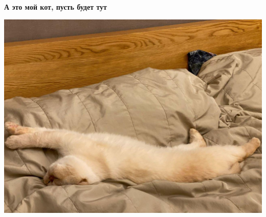 \documentclass[a4paper,12pt]{article}
\begin{document}
\clearpage
{\Large \begin{center}
\textbf{А это мой кот, пусть будет тут }
\end{center}}
\begin{center}
\includegraphics[scale=0.4]{6.jpg}
\end{center}
\clearpage
\end{document}

